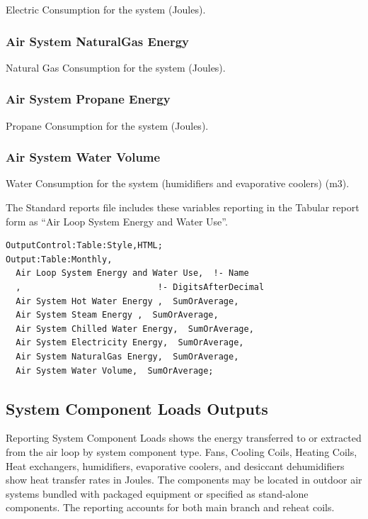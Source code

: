 Electric Consumption for the system (Joules).

\subsubsection{Air System NaturalGas Energy}\label{air-system-gas-energy}

Natural Gas Consumption for the system (Joules).

\subsubsection{Air System Propane Energy}

Propane Consumption for the system (Joules).

\subsubsection{Air System Water Volume}\label{air-system-water-volume}

Water Consumption for the system (humidifiers and evaporative coolers) (m3).

The Standard reports file includes these variables reporting in the Tabular report form as ``Air Loop System Energy and Water Use''.

\begin{lstlisting}
OutputControl:Table:Style,HTML;
Output:Table:Monthly,
  Air Loop System Energy and Water Use,  !- Name
  ,                           !- DigitsAfterDecimal
  Air System Hot Water Energy ,  SumOrAverage,
  Air System Steam Energy ,  SumOrAverage,
  Air System Chilled Water Energy,  SumOrAverage,
  Air System Electricity Energy,  SumOrAverage,
  Air System NaturalGas Energy,  SumOrAverage,
  Air System Water Volume,  SumOrAverage;
\end{lstlisting}

\subsection{System Component Loads Outputs}\label{system-component-loads-outputs}

Reporting System Component Loads shows the energy transferred to or extracted from the air loop by system component type. Fans, Cooling Coils, Heating Coils, Heat exchangers, humidifiers, evaporative coolers, and desiccant dehumidifiers show heat transfer rates in Joules. The components may be located in outdoor air systems bundled with packaged equipment or specified as stand-alone components. The reporting accounts for both main branch and reheat coils.

